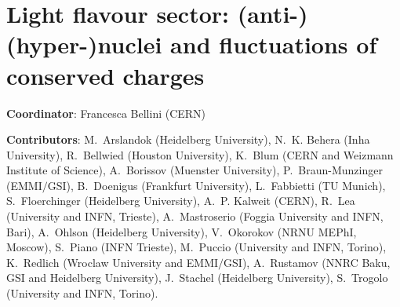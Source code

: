 \documentclass[../report.tex]{subfiles}
\providecommand{\main}{..}
\begin{document}
\clearpage
\section{Light flavour sector: (anti-)(hyper-)nuclei and fluctuations of conserved charges}
\label{sec:lf}

{ \small
\noindent \textbf{Coordinator}: Francesca Bellini (CERN)

\noindent \textbf{Contributors}: 
M.~Arslandok (Heidelberg University), 
N.~K. Behera (Inha University), 
R.~Bellwied (Houston University), 
K.~Blum (CERN and Weizmann Institute of Science), 
A.~Borissov (Muenster University), 
P.~Braun-Munzinger (EMMI$/$GSI), 
B.~Doenigus (Frankfurt University), 
L.~Fabbietti (TU Munich), 
S.~Floerchinger (Heidelberg University), 
A.~P. Kalweit (CERN), 
R.~Lea (University and INFN, Trieste), 
A.~Mastroserio (Foggia University and INFN, Bari),
A.~Ohlson (Heidelberg University), 
V.~Okorokov (NRNU MEPhI, Moscow), 
S.~Piano (INFN Trieste), 
M.~Puccio (University and INFN, Torino), 
K.~Redlich (Wroclaw University and EMMI$/$GSI), 
A.~Rustamov (NNRC Baku, GSI and Heidelberg University), 
J.~Stachel (Heidelberg University), 
S.~Trogolo (University and INFN, Torino).
}





%
\end{document}
